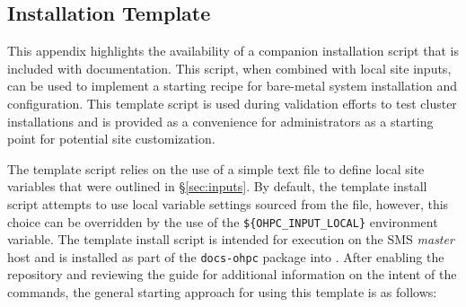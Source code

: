 \subsection{Installation Template}  \label{appendix:template_script}

This appendix highlights the availability of a companion installation script
that is included with \OHPC{} documentation. This script, when combined with
local site inputs, can be used to implement a starting recipe for
bare-metal system installation and configuration. This template script is used
during validation efforts to test cluster installations and is provided as a
convenience for administrators as a starting point for potential site
customization. 

The template script relies on the use of a simple text file to define local
site variables that were outlined in \S\ref{sec:inputs}. By default, the
template install script attempts to use local variable settings sourced from
the  file, however, this
choice can be overridden by the use of the \texttt{\$\{OHPC\_INPUT\_LOCAL\}}
environment variable. The template install script is intended for execution on
the SMS {\em master} host and is installed as part of the \texttt{docs-ohpc}
package into . After
enabling the \OHPC{} repository and reviewing the guide for additional
information on the intent of the commands, the general starting approach for
using this template is as follows:

